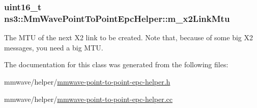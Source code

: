 \subsubsection[{\texorpdfstring{m\+\_\+x2\+Link\+Mtu}{m_x2LinkMtu}}]{\setlength{\rightskip}{0pt plus 5cm}uint16\+\_\+t ns3\+::\+Mm\+Wave\+Point\+To\+Point\+Epc\+Helper\+::m\+\_\+x2\+Link\+Mtu\hspace{0.3cm}{\ttfamily [private]}}\hypertarget{classns3_1_1MmWavePointToPointEpcHelper_a51de907fdf82a42d7ce14aac988255b3}{}\label{classns3_1_1MmWavePointToPointEpcHelper_a51de907fdf82a42d7ce14aac988255b3}
The M\+TU of the next X2 link to be created. Note that, because of some big X2 messages, you need a big M\+TU. 

The documentation for this class was generated from the following files\+:\begin{DoxyCompactItemize}
\item 
mmwave/helper/\hyperlink{mmwave-point-to-point-epc-helper_8h}{mmwave-\/point-\/to-\/point-\/epc-\/helper.\+h}\item 
mmwave/helper/\hyperlink{mmwave-point-to-point-epc-helper_8cc}{mmwave-\/point-\/to-\/point-\/epc-\/helper.\+cc}\end{DoxyCompactItemize}
